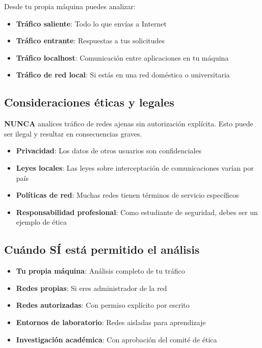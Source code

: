 \begin{itemize}
Desde tu propia máquina puedes analizar:

\begin{itemize}
    \item \textbf{Tráfico saliente}: Todo lo que envías a Internet
    \item \textbf{Tráfico entrante}: Respuestas a tus solicitudes
    \item \textbf{Tráfico localhost}: Comunicación entre aplicaciones en tu máquina
    \item \textbf{Tráfico de red local}: Si estás en una red doméstica o universitaria
\end{itemize}

\subsection{Consideraciones éticas y legales}

\begin{tcolorbox}[colback=red!5!white,colframe=red!60!gray,title=\textbf{ADVERTENCIA IMPORTANTE}]
\textbf{NUNCA} analices tráfico de redes ajenas sin autorización explícita. Esto puede ser ilegal y resultar en consecuencias graves.
\end{tcolorbox}

\begin{itemize}
    \item \textbf{Privacidad}: Los datos de otros usuarios son confidenciales
    \item \textbf{Leyes locales}: Las leyes sobre interceptación de comunicaciones varían por país
    \item \textbf{Políticas de red}: Muchas redes tienen términos de servicio específicos
    \item \textbf{Responsabilidad profesional}: Como estudiante de seguridad, debes ser un ejemplo de ética
\end{itemize}

\subsection{Cuándo SÍ está permitido el análisis}

\begin{itemize} 
    \item \textbf{Tu propia máquina}: Análisis completo de tu tráfico
    \item \textbf{Redes propias}: Si eres administrador de la red
    \item \textbf{Redes autorizadas}: Con permiso explícito por escrito
    \item \textbf{Entornos de laboratorio}: Redes aisladas para aprendizaje
    \item \textbf{Investigación académica}: Con aprobación del comité de ética
\end{itemize}


\end{itemize}
